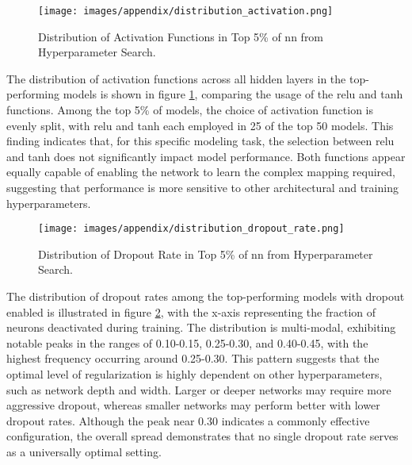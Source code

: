 \begin{figure}[H]
	\centering
	\texttt{[image: images/appendix/distribution\_activation.png]}
	\caption{Distribution of Activation Functions in Top 5\% of \ac{nn} from Hyperparameter Search.}
	\label{fig:distribution_activation}
\end{figure}
The distribution of activation functions across all hidden layers in the top-performing models is shown in figure \ref{fig:distribution_activation}, comparing the usage of the \ac{relu} and \ac{tanh} functions. Among the top 5\% of models, the choice of activation function is evenly split, with \ac{relu} and \ac{tanh} each employed in 25 of the top 50 models. This finding indicates that, for this specific modeling task, the selection between \ac{relu} and \ac{tanh} does not significantly impact model performance. Both functions appear equally capable of enabling the network to learn the complex mapping required, suggesting that performance is more sensitive to other architectural and training hyperparameters.

\begin{figure}[H]
	\centering
	\texttt{[image: images/appendix/distribution\_dropout\_rate.png]}
	\caption{Distribution of Dropout Rate in Top 5\% of \ac{nn} from Hyperparameter Search.}
	\label{fig:distribution_dropout}
\end{figure}
The distribution of dropout rates among the top-performing models with dropout enabled is illustrated in figure \ref{fig:distribution_dropout}, with the x-axis representing the fraction of neurons deactivated during training. The distribution is multi-modal, exhibiting notable peaks in the ranges of 0.10-0.15, 0.25-0.30, and 0.40-0.45, with the highest frequency occurring around 0.25-0.30. This pattern suggests that the optimal level of regularization is highly dependent on other hyperparameters, such as network depth and width. Larger or deeper networks may require more aggressive dropout, whereas smaller networks may perform better with lower dropout rates. Although the peak near 0.30 indicates a commonly effective configuration, the overall spread demonstrates that no single dropout rate serves as a universally optimal setting.

